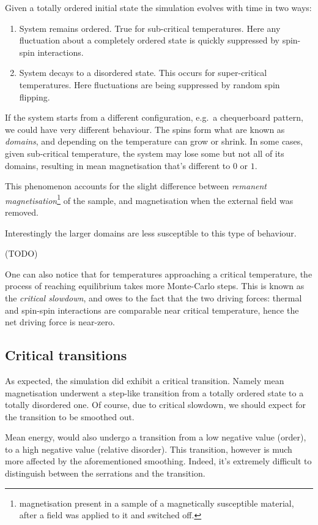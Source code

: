 \documentclass[11pt]{article}
\begin{document}
Given a totally ordered initial state the simulation evolves with time in two ways:

\begin{enumerate}
\item System remains ordered. True for sub-critical temperatures. Here any fluctuation about a completely ordered state is quickly suppressed by spin-spin interactions.
\item System decays to a disordered state. This occurs for super-critical temperatures. Here fluctuations are being suppressed by random spin flipping. 
\end{enumerate}

If the system starts from a different configuration, e.g.~a chequerboard pattern, we could have very different behaviour. The spins form what are known as \emph{domains}, and depending on the temperature can grow or shrink. In some cases, given sub-critical temperature, the system may lose some but not all of its domains, resulting in mean magnetisation that's different to \(0\) or \(1\).

This phenomenon accounts for the slight difference between \emph{remanent magnetisation}\footnote{magnetisation present in a sample of a magnetically susceptible material, after a field was applied to it and switched off. } of the sample, and magnetisation when the external field was removed.

Interestingly the larger domains are less susceptible to this type of behaviour.

(TODO)

One can also notice that for temperatures approaching a critical temperature, the process of reaching equilibrium takes more Monte-Carlo steps. This is known as the \emph{critical slowdown}, and owes to the fact that the two driving forces: thermal and spin-spin interactions are comparable near critical temperature, hence the net driving force is near-zero. 

\subsection{Critical transitions}

As expected, the simulation did exhibit a critical transition. Namely mean magnetisation underwent a step-like transition from a totally ordered state to a totally disordered one. Of course, due to critical slowdown, we should expect for the transition to be smoothed out.

Mean energy, would also undergo a transition from a low negative value (order), to a high negative value (relative disorder). This transition, however is much more affected by the aforementioned smoothing. Indeed, it's extremely difficult to distinguish between the serrations and the transition. 
\end{document}
